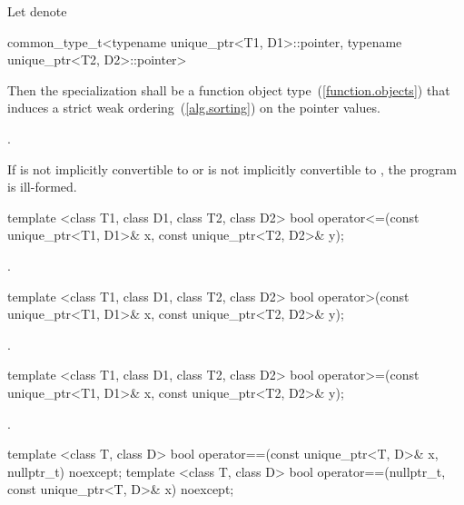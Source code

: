 \begin{itemdescr}
\pnum
\requires Let  denote
\begin{codeblock}
common_type_t<typename unique_ptr<T1, D1>::pointer,
              typename unique_ptr<T2, D2>::pointer>
\end{codeblock}
Then the specialization
 shall be a function object type~(\ref{function.objects}) that
induces a strict weak ordering~(\ref{alg.sorting}) on the pointer values.

\pnum
\returns {}.

\pnum
\remarks If  is not implicitly convertible
to  or  is not implicitly
convertible to , the program is ill-formed.
\end{itemdescr}

%
\begin{itemdecl}
template <class T1, class D1, class T2, class D2>
  bool operator<=(const unique_ptr<T1, D1>& x, const unique_ptr<T2, D2>& y);
\end{itemdecl}

\begin{itemdescr}
\pnum
\returns {}.
\end{itemdescr}

%
\begin{itemdecl}
template <class T1, class D1, class T2, class D2>
  bool operator>(const unique_ptr<T1, D1>& x, const unique_ptr<T2, D2>& y);
\end{itemdecl}

\begin{itemdescr}
\pnum
\returns {}.
\end{itemdescr}

%
\begin{itemdecl}
template <class T1, class D1, class T2, class D2>
  bool operator>=(const unique_ptr<T1, D1>& x, const unique_ptr<T2, D2>& y);
\end{itemdecl}

\begin{itemdescr}
\pnum
\returns {}.
\end{itemdescr}

%
\begin{itemdecl}
template <class T, class D>
  bool operator==(const unique_ptr<T, D>& x, nullptr_t) noexcept;
template <class T, class D>
  bool operator==(nullptr_t, const unique_ptr<T, D>& x) noexcept;
\end{itemdecl}

